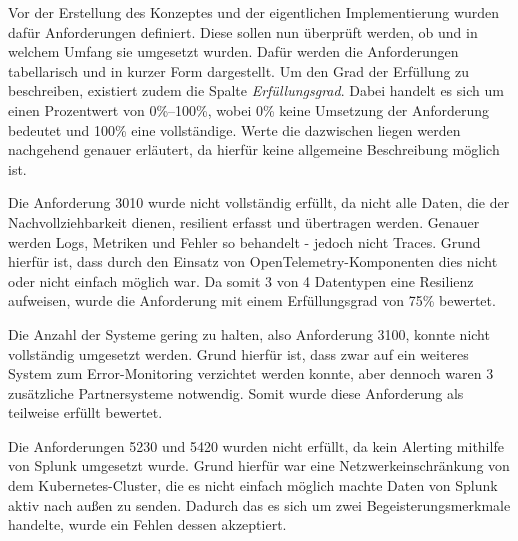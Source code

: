 
Vor der Erstellung des Konzeptes und der eigentlichen Implementierung wurden dafür Anforderungen definiert. Diese sollen nun überprüft werden, ob und in welchem Umfang sie umgesetzt wurden. Dafür werden die Anforderungen tabellarisch und in kurzer Form dargestellt. Um den Grad der Erfüllung zu beschreiben, existiert zudem die Spalte \textit{Erfüllungsgrad}. Dabei handelt es sich um einen Prozentwert von 0\%--100\%, wobei 0\% keine Umsetzung der Anforderung bedeutet und 100\% eine vollständige. Werte die dazwischen liegen werden nachgehend genauer erläutert, da hierfür keine allgemeine Beschreibung möglich ist.
	


Die Anforderung 3010 wurde nicht vollständig erfüllt, da nicht alle Daten, die der Nachvollziehbarkeit dienen, resilient erfasst und übertragen werden. Genauer werden Logs, Metriken und Fehler so behandelt - jedoch nicht Traces. Grund hierfür ist, dass durch den Einsatz von OpenTelemetry-Komponenten dies nicht oder nicht einfach möglich war. Da somit 3 von 4 Datentypen eine Resilienz aufweisen, wurde die Anforderung mit einem Erfüllungsgrad von 75\% bewertet.

Die Anzahl der Systeme gering zu halten, also Anforderung 3100, konnte nicht vollständig umgesetzt werden. Grund hierfür ist, dass zwar auf ein weiteres System zum Error-Monitoring verzichtet werden konnte, aber dennoch waren 3 zusätzliche Partnersysteme notwendig. Somit wurde diese Anforderung als teilweise erfüllt bewertet.

Die Anforderungen 5230 und 5420 wurden nicht erfüllt, da kein Alerting mithilfe von Splunk umgesetzt wurde. Grund hierfür war eine Netzwerkeinschränkung von dem Kubernetes-Cluster, die es nicht einfach möglich machte Daten von Splunk aktiv nach außen zu senden. Dadurch das es sich um zwei Begeisterungsmerkmale handelte, wurde ein Fehlen dessen akzeptiert.